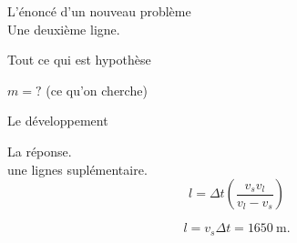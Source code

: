 \begin{exercise}
L'énoncé d'un nouveau problème\\
Une deuxième ligne.
\end{exercise}
\begin{solution}
 Tout ce qui est hypothèse

 $m=?$ (ce qu'on cherche)

 Le développement

La réponse.\\
une lignes suplémentaire.
\begin{equation}
    l = \Delta t (\frac{v_s v_l}{v_l-v_s})
\end{equation}
    \bad{
    $\si{\cancel\second} \frac{
\si{\square\meter\per\cancel\square\second} }{\si{\meter\per\cancel\second}} =
\si{\meter}$
    }

    \begin{equation}
    l = v_s \Delta t = \SI{1650}{\meter}.
\end{equation}
    \bad{
    \si[per-mode = fraction]{\meter\per\cancel\second\cancel\second} =
\si{\meter}
    }
\end{solution}